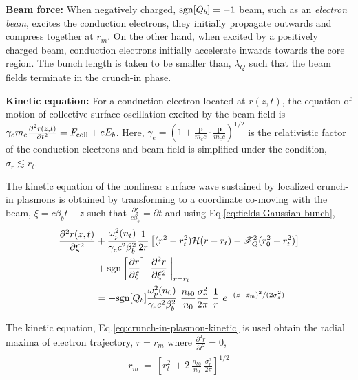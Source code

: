 \documentclass[aps,twocolumn,notitlepage,superscriptaddress]{revtex4-1}
\renewcommand\vec{\mathbf}
\begin{document}
{\bf Beam force:} When negatively charged, ${\rm sgn}[Q_b] = -1$ beam, such as an {\it electron beam}, excites the conduction electrons, they initially propagate outwards and compress together at $r_m$. On the other hand, when excited by a positively charged beam, conduction electrons initially accelerate inwards towards the core region. The bunch length is taken to be smaller than, $\lambda_Q$ such that the beam fields terminate in the crunch-in phase. 
 
{\bf Kinetic equation:} For a conduction electron located at $r(z,t)$, the equation of motion of collective surface oscillation excited by the beam field is $\gamma_e m_e \frac{\partial^2 r(z,t)}{\partial t^2} = F_{\rm coll} + eE_b$. Here, $\gamma_e = \left( 1 + \frac{\vec{p}}{m_ec}\cdot\frac{\vec{p}}{m_ec}\right)^{1/2}$ is the relativistic factor of the conduction electrons and beam field is simplified under the condition, $\sigma_r\lesssim r_t$. 

The kinetic equation of the nonlinear surface wave sustained by localized crunch-in plasmons is obtained by transforming to a coordinate co-moving with the beam, $\xi = c\beta_b t - z$ such that $\frac{\partial \xi}{c\beta_b} =  \partial t$ and using Eq.\ref{eq:fields-Gaussian-bunch},
\begin{align}\label{eq:crunch-in-plasmon-kinetic}
\begin{split}
\frac{\partial^2 r(z,t)}{\partial \xi^2} & +  \frac{\omega_{p}^2(n_t)}{\gamma_e c^2\beta_b^2} \frac{1}{2r} \left[ (r^2 - r_t^2)\mathcal{H}(r-r_t) - \mathscr{F}_Q^2(r_0^2 - r_t^2)  \right] \\
& + {\rm sgn} \left[\frac{\partial r}{\partial \xi}\right] ~ \frac{\partial^2 r}{\partial \xi^2} \biggm\lvert_{r=r_t}  \\
& = - {\rm sgn}[Q_b] \frac{\omega_{p}^2(n_0)}{\gamma_ec^2\beta_b^2} ~ \frac{n_{b0}}{n_0} \frac{\sigma_r^2}{2\pi} ~ \frac{1}{r} ~ e^{{-(z-z_{\rm m})^2/(2\sigma_z^2)}} 
\end{split}
\end{align}

The kinetic equation, Eq.\ref{eq:crunch-in-plasmon-kinetic} is used obtain the radial maxima of electron trajectory, $r = r_m$ where $\frac{\partial^2 r}{\partial t^2} = 0$,
\begin{align}\label{eq:r-max-nano-Gaussian}
\begin{split} 
r_m ~ = ~\left[ r_t^2 ~ + 2 ~ \frac{n_{b0}}{n_0} ~ \frac{\sigma_r^2}{2\pi} \right]^{1/2} 
\end{split}
\end{align}
\end{document}
